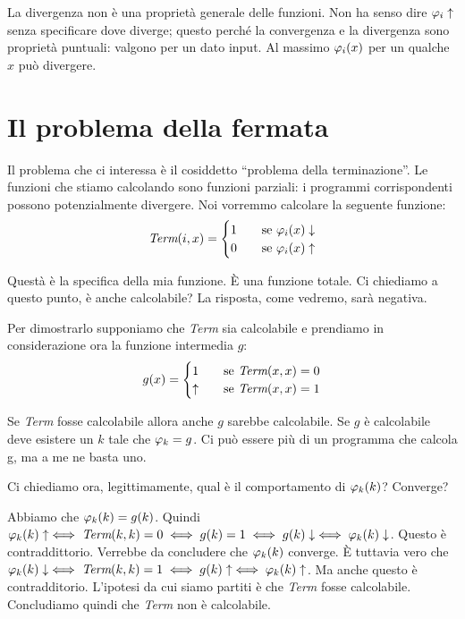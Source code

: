 La divergenza non è una proprietà generale delle funzioni. Non ha senso dire $\varphi_{i} \uparrow$ senza
specificare dove diverge; questo perché la convergenza e la divergenza sono proprietà puntuali:
valgono per un dato input. Al massimo $\varphi_{i}(x)$ per un qualche $x$ può divergere.

\section{Il problema della fermata}

Il problema che ci interessa è il cosiddetto ``problema della terminazione''. Le funzioni che
stiamo calcolando sono funzioni parziali: i programmi corrispondenti possono potenzialmente
divergere. Noi vorremmo calcolare la seguente funzione:
\begin{equation*}
\textit{Term}(i,x) =
    \begin{cases}
        1 \quad & \text{se $\varphi_{i}(x) \downarrow$} \\
        0 \quad & \text{se $\varphi_{i}(x) \uparrow$} 
    \end{cases}
\end{equation*}

Questà è la specifica della mia funzione. È una funzione totale. Ci chiediamo a questo punto, è
anche calcolabile? La risposta, come vedremo, sarà negativa.

Per dimostrarlo supponiamo che \textit{Term} sia calcolabile e prendiamo in considerazione ora la
funzione intermedia $g$:
\begin{equation*}
    g(x) =
    \begin{cases}
        1 \quad & \text{se $\textit{Term}(x,x) = 0$} \\
        \uparrow \quad & \text{se $\textit{Term}(x,x) = 1$} 
    \end{cases}
\end{equation*}

Se \textit{Term} fosse calcolabile allora anche $g$ sarebbe calcolabile. Se $g$ è calcolabile deve
esistere un $k$ tale che $\varphi_{k} = g$. Ci può essere più di un programma che calcola g, ma a me ne
basta uno.

Ci chiediamo ora, legittimamente, qual è il comportamento di $\varphi_{k}(k)$? Converge?

Abbiamo che $\varphi_{k}(k) = g(k)$. Quindi $\varphi_{k}(k) \uparrow \iff \textit{Term}(k,k) = 0 \iff g(k) = 1
\iff g(k) \downarrow \iff \varphi_{k}(k) \downarrow$. Questo è contraddittorio. Verrebbe da concludere che
$\varphi_{k}(k)$ converge. È tuttavia vero che $\varphi_{k}(k) \downarrow \iff \textit{Term}(k,k) = 1 \iff g(k)
\uparrow \iff \varphi_{k}(k) \uparrow$. Ma anche questo è contradditorio. L'ipotesi da cui siamo partiti
è che \textit{Term} fosse calcolabile. Concludiamo quindi che \textit{Term} non è calcolabile.

